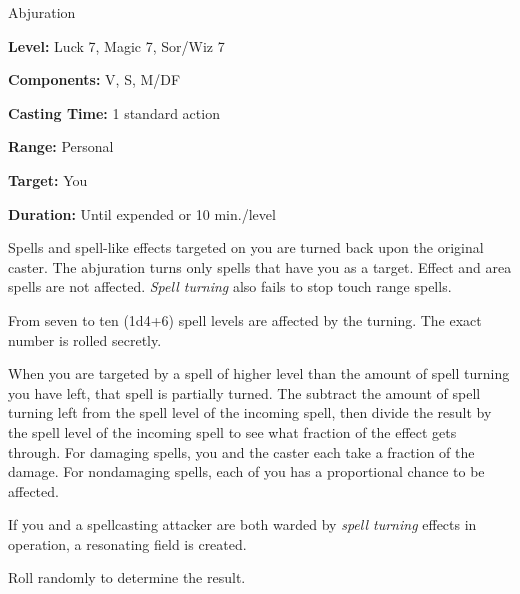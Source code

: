 
Abjuration

\textbf{Level:} Luck 7, Magic 7, Sor/Wiz 7

\textbf{Components:} V, S, M/DF

\textbf{Casting Time:} 1 standard action

\textbf{Range:} Personal

\textbf{Target:} You

\textbf{Duration:} Until expended or 10 min./level

Spells and spell-like effects targeted on you are turned back upon the original 
caster. The abjuration turns only spells that have you as a target. Effect and 
area spells are not affected. \textit{Spell turning} also fails to stop touch range 
spells. 

From seven to ten (1d4+6) spell levels are affected by the turning. The exact number 
is rolled secretly.

When you are targeted by a spell of higher level than the amount of spell turning 
you have left, that spell is partially turned. The subtract the amount of spell 
turning left from the spell level of the incoming spell, then divide the result 
by the spell level of the incoming spell to see what fraction of the effect gets 
through. For damaging spells, you and the caster each take a fraction of the damage. 
For nondamaging spells, each of you has a proportional chance to be affected.

If you and a spellcasting attacker are both warded by \textit{spell turning} effects 
in operation, a resonating field is created.

Roll randomly to determine the result.

